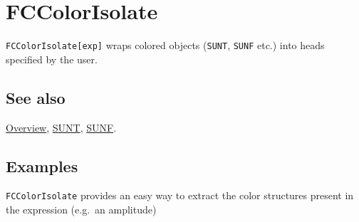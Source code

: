 \documentclass[../FeynCalcManual.tex]{subfiles}
\begin{document}
\hypertarget{fccolorisolate}{%
\section{FCColorIsolate}\label{fccolorisolate}}

\texttt{FCColorIsolate[\allowbreak{}exp]} wraps colored objects
(\texttt{SUNT}, \texttt{SUNF} etc.) into heads specified by the user.

\subsection{See also}

\hyperlink{toc}{Overview}, \hyperlink{sunt}{SUNT},
\hyperlink{sunf}{SUNF}.

\subsection{Examples}

\texttt{FCColorIsolate} provides an easy way to extract the color
structures present in the expression (e.g.~an amplitude)
\end{document}
